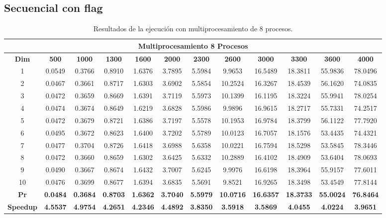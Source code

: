 \documentclass{article}
\begin{document}

\subsection{Secuencial con flag}

\begin{table}[H]
\centering
\tiny
\begin{tabular}{|c|c|c|c|c|c|c|c|c|c|c|c|}
\hline
\multicolumn{12}{|c|}{\textbf{Multiprocesamiento 8 Procesos}} \\
\hline
\textbf{Dim} & \textbf{500} & \textbf{1000} & \textbf{1300} & \textbf{1600} & \textbf{2000} & \textbf{2300} & \textbf{2600} & \textbf{3000} & \textbf{3300} & \textbf{3600} & \textbf{4000} \\
\hline
1  & 0.0549 & 0.3766 & 0.8910 & 1.6376 & 3.7895 & 5.5984 & 9.9653 & 16.5489 & 18.3811 & 55.9836 & 78.0496 \\
2  & 0.0467 & 0.3661 & 0.8717 & 1.6303 & 3.6902 & 5.5854 & 10.2524 & 16.3267 & 18.4539 & 56.1620 & 74.0835 \\
3  & 0.0472 & 0.3659 & 0.8669 & 1.6391 & 3.7119 & 5.5973 & 10.1399 & 16.1195 & 18.3224 & 55.9941 & 78.0254 \\
4  & 0.0474 & 0.3674 & 0.8649 & 1.6219 & 3.6828 & 5.5986 & 9.9896 & 16.9615 & 18.2717 & 55.7331 & 74.2517 \\
5  & 0.0472 & 0.3679 & 0.8721 & 1.6386 & 3.7197 & 5.5578 & 10.1953 & 16.9784 & 18.3799 & 56.1122 & 77.7920 \\
6  & 0.0495 & 0.3672 & 0.8623 & 1.6400 & 3.7202 & 5.5789 & 10.0123 & 16.7057 & 18.1576 & 53.4435 & 74.4321 \\
7  & 0.0477 & 0.3704 & 0.8726 & 1.6418 & 3.6988 & 5.6358 & 10.0221 & 16.7594 & 18.5298 & 53.5845 & 78.3446 \\
8  & 0.0472 & 0.3660 & 0.8659 & 1.6302 & 3.6425 & 5.6332 & 10.2889 & 16.4102 & 18.4909 & 53.6404 & 78.0693 \\
9  & 0.0490 & 0.3667 & 0.8674 & 1.6432 & 3.7007 & 5.6245 & 9.9976 & 16.6198 & 18.3964 & 55.9157 & 77.6011 \\
10 & 0.0476 & 0.3699 & 0.8677 & 1.6394 & 3.6835 & 5.5691 & 9.8521 & 16.9265 & 18.3498 & 53.4549 & 77.8144 \\
\hline
\textbf{Pr} & \textbf{0.0484} & \textbf{0.3684} & \textbf{0.8703} & \textbf{1.6362} & \textbf{3.7040} & \textbf{5.5979} & \textbf{10.0716} & \textbf{16.6357} & \textbf{18.3733} & \textbf{55.0024} & \textbf{76.8464} \\
\hline
\textbf{Speedup} & \textbf{4.5537} & \textbf{4.9754} & \textbf{4.2651} & \textbf{4.2346} & \textbf{4.4892} & \textbf{3.8350} & \textbf{3.5918} & \textbf{3.5869} & \textbf{4.0455} & \textbf{4.0224} & \textbf{3.9651} \\
\hline
\end{tabular}
\label{tab:mp8}
\caption{Resultados de la ejecución con multiprocesamiento de 8 procesos.}
\end{table}
\end{document}
